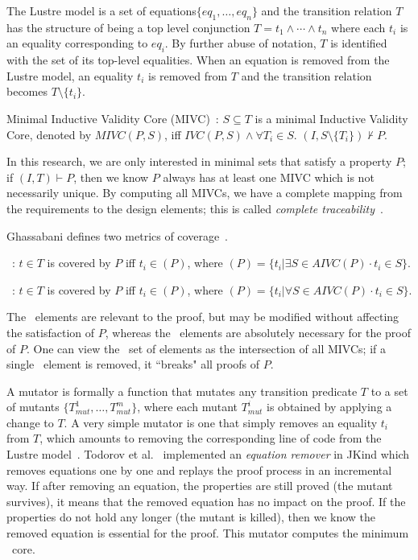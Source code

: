 The Lustre model is a set of equations$\{eq_1, \dots,eq_n\}$ and the transition relation $T$ has the structure of being a top level conjunction $T = t_1 \land \cdots \land t_n$ where each $t_i$ is an equality corresponding to $eq_i$. By further abuse of notation, $T$ is identified with the set of its top-level equalities. When an equation is removed from the Lustre model, an equality $t_i$ is removed from $T$ and the transition relation becomes $T\setminus \{t_i\}$. 

\begin{definition}
Minimal Inductive Validity Core (MIVC)~\cite{Ghassabani2017EfficientGO}: $S \subseteq T$ is a minimal Inductive Validity Core, denoted by $MIVC(P,S)$, iff $IVC(P,S) \land \forall T_i \in S$. $(I, S \setminus \{T_i\}) \not \vdash P$.
\end{definition}

In this research, we are only interested in minimal sets that satisfy a property $P$; if $(I, T) \vdash P$, then we know $P$ always has at least one MIVC which is not necessarily unique. By computing all MIVCs, we have a complete mapping from the requirements to the design elements; this is called \emph{complete traceability}~\cite{murugesan2016complete}. 

Ghassabani defines two metrics of coverage~\cite{ghassabani2017proof}. 

\begin{definition} \maycov\ : $t \in T$ is covered by $P$ iff $t_i \in $\maycov$(P)$, where \maycov$(P) = \{t_i | \exists S \in AIVC(P) \cdot t_i \in S\}$.
\end{definition}

\begin{definition} \mustcov\ : $t \in T$ is covered by $P$ iff $t_i \in $\maycov$(P)$, where \maycov$(P) = \{t_i | \forall S \in AIVC(P) \cdot t_i \in S\}$.
\end{definition}

The \maycov\ elements are relevant to the proof, but may be modified without affecting the satisfaction of $P$, whereas the \mustcov\ elements are absolutely necessary for the proof of $P$. One can view the \mustcov\ set of elements as the intersection of all MIVCs; if a single \mustcov\ element is removed, it ``breaks" all proofs of $P$. 

A mutator is formally a function that mutates any transition predicate $T$ to a set of mutants $\{T^1_{mut}, \dots, T^m_{mut}\}$, where each mutant $T^i_{mut}$ is obtained by applying a change to $T$. A very simple mutator is one that simply removes an equality $t_i$ from $T$, which amounts to removing the corresponding line of code from the Lustre model~\cite{NFM2020Todorov}. Todorov et al.~\cite{NFM2020Todorov} implemented an \emph{equation remover} in JKind which removes equations one by one and replays the proof process in an incremental way. If after removing an equation, the properties are still proved (the mutant survives), it means that the removed equation has no impact on the proof. If the properties do not hold any longer (the mutant is killed), then we know the removed equation is essential for the proof. This mutator computes the minimum \mustcov\ core. 


